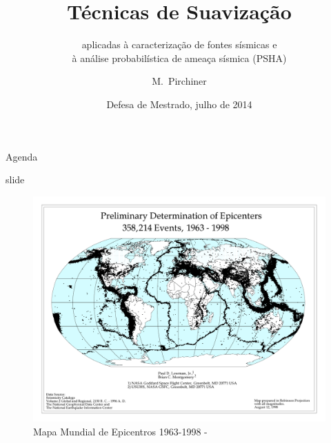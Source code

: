 \documentclass[ucs,8pt]{beamer}
\title[Smoothing Techniques] %
{Técnicas de Suavização}
\subtitle
{aplicadas à caracterização de fontes sísmicas e \\ 
 à análise probabilística de ameaça sísmica (PSHA)}
\author[Pirchiner, Marlon] %
{M.~Pirchiner }
\institute[EMAp-FGV / IAG-USP] %
{EMAp-FGV / Centro de Sismologia - USP}
\date[EMAP2014] %
{Defesa de Mestrado, julho de 2014}
\begin{document}
\begin{frame}[plain]
  \titlepage
\end{frame}

\begin{frame}{Agenda}
  \tableofcontents
\end{frame}

\begin{frame}{slide}

\begin{figure}[H]
   \centering
   \includegraphics[height=0.95\textheight]{global_pde_mag_all}
   \caption[Mapa Mundial de Epicentros 1963-1998]
   		   {Mapa Mundial de Epicentros 1963-1998 - \citet{lowman_jr_1998}} 
   \label{f:global_epicenters}
\end{figure} 


\end{frame}
\end{document}
